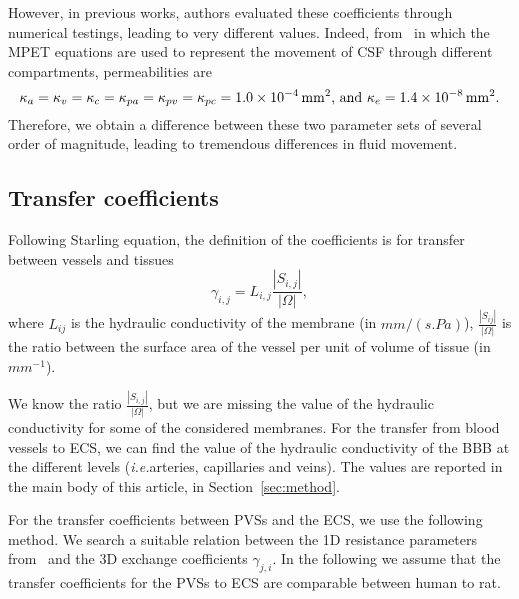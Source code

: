 \documentclass[10pt]{article}
\newcommand{\ie}{\emph{i.e.}\;}
\newcommand{\1}{^{(1)}}
\newcommand{\2}{^{(2)}}
\newcommand{\abs}[1]{\left\lvert#1\right\rvert}
\begin{document}
However, in previous works, authors evaluated these coefficients through numerical testings, leading to very different values. Indeed, from~\cite{tully_ventikos_2011,Guo-2019-MPET,eliseussen2021posteriori} in which the MPET equations are used to represent the movement of CSF through different compartments, permeabilities are 
\[
    \kappa_{a} = \kappa_v = \kappa_{c}  = \kappa_{pa} = \kappa_{pv} = \kappa_{pc}  = 1.0 \times 10^{-4}\,\text{\si{mm^2}, and } \kappa_e = 1.4\times 10^{-8} \, \text{\si{mm^2}}.
\]
Therefore, we obtain a difference between these two parameter sets of several order of magnitude, leading to tremendous differences in fluid movement. 



\subsection{Transfer coefficients}




Following Starling equation, the definition of the coefficients is for transfer between vessels and tissues
\begin{equation}
    \gamma_{i, j} = L_{i,j} \frac{\abs{S_{i,j}}}{\abs{\Omega}}, 
    \label{eq:mass-transfer-convect}
\end{equation}
where $L_{ij}$ is the hydraulic conductivity of the membrane (in $\si{mm /(s. Pa)}$), $\frac{\abs{S_{ij}}}{\abs{\Omega}}$ is the ratio between the surface area of the vessel per unit of volume of tissue (in $\si{mm^{-1}}$). 

We know the ratio $\frac{\abs{S_{i,j}}}{\abs{\Omega}}$, but we are missing the value of the hydraulic conductivity for some of the considered membranes. For the transfer from blood vessels to ECS, we can find the value of the hydraulic conductivity of the BBB at the different levels (\ie arteries, capillaries and veins). The values are reported in the main body of this article, in Section~\ref{sec:method}.

For the transfer coefficients between PVSs and the ECS, we use the following method. We search a suitable relation between the 1D resistance parameters from~\cite{Vinje-2020-ICP} and the 3D exchange coefficients $\gamma_{j, i}$. 
In the following we assume that the transfer coefficients for the PVSs to ECS are comparable between human to rat.
\end{document}
